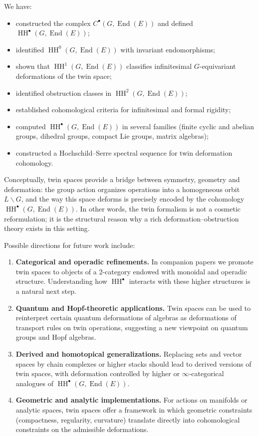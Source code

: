\documentclass[11pt,a4paper]{article}
\numberwithin{equation}{section}
\DeclareMathOperator{\End}{End}
\DeclareMathOperator{\HH}{HH}
\newcommand{\LinearSubgroup}{L}
\newcommand{\Cochain}{C}
\begin{document}
	We have:
	\begin{itemize}
		\item constructed the complex $\Cochain^\bullet(G,\End(E))$ and defined $\HH^\bullet(G,\End(E))$;
		\item identified $\HH^0(G,\End(E))$ with invariant endomorphisms;
		\item shown that $\HH^1(G,\End(E))$ classifies infinitesimal $G$-equivariant deformations of the twin space;
		\item identified obstruction classes in $\HH^2(G,\End(E))$;
		\item established cohomological criteria for infinitesimal and formal rigidity;
		\item computed $\HH^\bullet(G,\End(E))$ in several families (finite cyclic and abelian groups, dihedral groups, compact Lie groups, matrix algebras);
		\item constructed a Hochschild--Serre spectral sequence for twin deformation cohomology.
	\end{itemize}
	
	Conceptually, twin spaces provide a bridge between symmetry, geometry and deformation:
	the group action organizes operations into a homogeneous orbit $\LinearSubgroup\backslash G$,
	and the way this space deforms is precisely encoded by the cohomology $\HH^\bullet(G,\End(E))$.
	In other words, the twin formalism is not a cosmetic reformulation; it is the structural
	reason why a rich deformation--obstruction theory exists in this setting.
	
	Possible directions for future work include:
	\begin{enumerate}[label=(\alph*)]
		\item \textbf{Categorical and operadic refinements.}
		In companion papers we promote twin spaces to objects of a 2-category endowed with monoidal
		and operadic structure. Understanding how $\HH^\bullet$ interacts with these higher structures
		is a natural next step.
		\item \textbf{Quantum and Hopf-theoretic applications.}
		Twin spaces can be used to reinterpret certain quantum deformations of algebras as deformations
		of transport rules on twin operations, suggesting a new viewpoint on quantum groups and Hopf algebras.
		\item \textbf{Derived and homotopical generalizations.}
		Replacing sets and vector spaces by chain complexes or higher stacks should lead to derived versions
		of twin spaces, with deformation controlled by higher or $\infty$-categorical analogues of
		$\HH^\bullet(G,\End(E))$.
		\item \textbf{Geometric and analytic implementations.}
		For actions on manifolds or analytic spaces, twin spaces offer a framework in which geometric constraints
		(compactness, regularity, curvature) translate directly into cohomological constraints on the admissible deformations.
	\end{enumerate}
	
\end{document}
